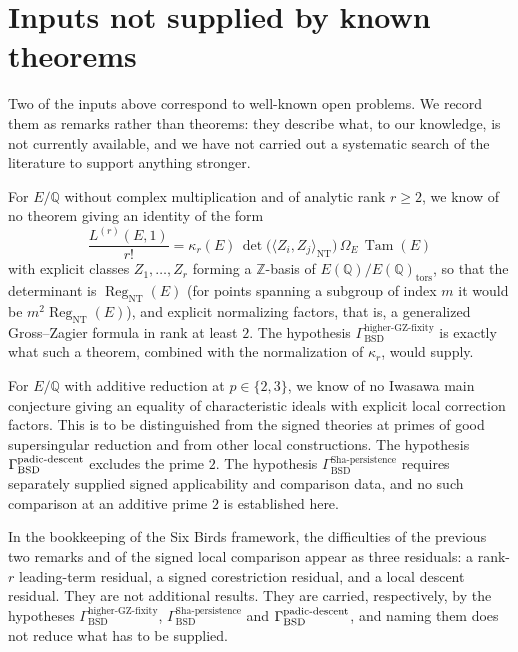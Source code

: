 \documentclass[11pt]{article}
\theoremstyle{definition}
\newcommand{\Q}{\mathbb{Q}}
\newcommand{\Z}{\mathbb{Z}}
\newcommand{\Reg}{\operatorname{Reg}}
\newcommand{\Tam}{\operatorname{Tam}}
\newcommand{\tors}{\operatorname{tors}}
\newcommand{\kapr}{\kappa_r}
\newcommand{\GammaSP}{\Gamma_{\mathrm{BSD}}^{\mathrm{Sha\text{-}persistence}}}
\newcommand{\GammaGZ}{\Gamma_{\mathrm{BSD}}^{\mathrm{higher\text{-}GZ\text{-}fixity}}}
\begin{document}
 \section{Inputs not supplied by known theorems}
\label{sec:obstructions}

Two of the inputs above correspond to well-known open problems.  We record
them as remarks rather than theorems: they describe what, to our
knowledge, is not currently available, and we have not carried out a
systematic search of the literature to support anything stronger.

\begin{remark}\label{rmk:closure:t-e12-gap}
For $E/\Q$ without complex multiplication and of analytic rank $r\ge2$,
we know of no theorem giving an identity of the form
\[
  \frac{L^{(r)}(E,1)}{r!}
  =
  \kapr(E)\,\det\bigl(\langle Z_i,Z_j\rangle_{\mathrm{NT}}\bigr)\,
  \Omega_E\,\Tam(E)
\]
with explicit classes $Z_1,\dots,Z_r$ forming a $\Z$-basis of
$E(\Q)/E(\Q)_{\tors}$, so that the determinant is $\Reg_{\mathrm{NT}}(E)$
(for points spanning a subgroup of index $m$ it would be
$m^2\Reg_{\mathrm{NT}}(E)$), and explicit normalizing factors, that is, a generalized Gross--Zagier formula in rank at least $2$.  The
hypothesis $\GammaGZ$ is exactly what such a theorem, combined with the
normalization of $\kapr$, would supply.
\end{remark}

\begin{remark}\label{rmk:closure:t-bad-gap}
For $E/\Q$ with additive reduction at $p\in\{2,3\}$, we know of no
Iwasawa main conjecture giving an equality of characteristic ideals with
explicit local correction factors.  This is to be distinguished from the
signed theories at primes of good supersingular reduction and from other
local constructions.  The hypothesis $\Gamma_{\mathrm{BSD}}^{\mathrm{padic\text{-}descent}}$ excludes the prime $2$.  The
hypothesis $\GammaSP$ requires separately supplied signed applicability
and comparison data, and no such comparison at an additive prime $2$ is
established here.
\end{remark}

\begin{remark}\label{rmk:closure:mode-b-residuals}
In the bookkeeping of the Six Birds framework, the difficulties of the
previous two remarks and of the signed local comparison appear as three
residuals: a rank-$r$ leading-term residual, a signed corestriction
residual, and a local descent residual.  They are not additional results.
They are carried, respectively, by the hypotheses $\GammaGZ$, $\GammaSP$
and $\Gamma_{\mathrm{BSD}}^{\mathrm{padic\text{-}descent}}$, and naming them does not reduce what has to be supplied.
\end{remark}
\end{document}
